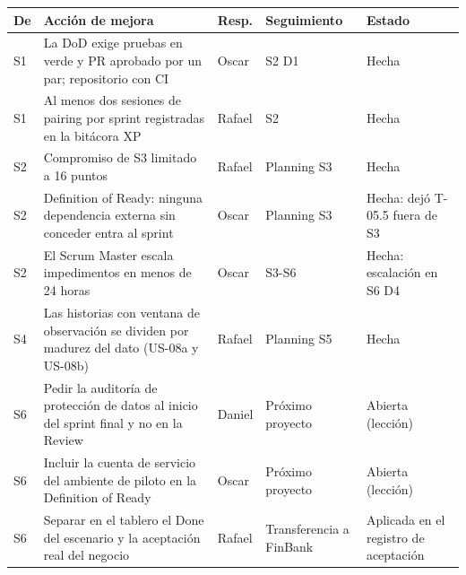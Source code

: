 \footnotesize
\begin{tabularx}{\linewidth}{l X l l p{3.2cm}}
\toprule
\textbf{De} & \textbf{Acción de mejora} & \textbf{Resp.} & \textbf{Seguimiento} & \textbf{Estado} \\
\midrule
S1 & La DoD exige pruebas en verde y PR aprobado por un par; repositorio con CI & Oscar & S2 D1 & Hecha \\
S1 & Al menos dos sesiones de pairing por sprint registradas en la bitácora XP & Rafael & S2 & Hecha \\
S2 & Compromiso de S3 limitado a 16 puntos & Rafael & Planning S3 & Hecha \\
S2 & Definition of Ready: ninguna dependencia externa sin conceder entra al sprint & Oscar & Planning S3 & Hecha: dejó T-05.5 fuera de S3 \\
S2 & El Scrum Master escala impedimentos en menos de 24 horas & Oscar & S3-S6 & Hecha: escalación en S6 D4 \\
S4 & Las historias con ventana de observación se dividen por madurez del dato (US-08a y US-08b) & Rafael & Planning S5 & Hecha \\
S6 & Pedir la auditoría de protección de datos al inicio del sprint final y no en la Review & Daniel & Próximo proyecto & Abierta (lección) \\
S6 & Incluir la cuenta de servicio del ambiente de piloto en la Definition of Ready & Oscar & Próximo proyecto & Abierta (lección) \\
S6 & Separar en el tablero el Done del escenario y la aceptación real del negocio & Rafael & Transferencia a FinBank & Aplicada en el registro de aceptación \\
\bottomrule
\end{tabularx}
